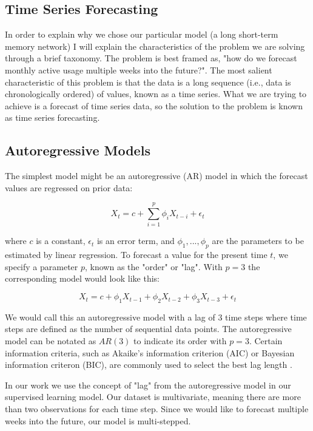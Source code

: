 \documentclass[11pt, oneside, authoryear]{report}
\begin{document}
\subsection{Time Series Forecasting}

In order to explain why we chose our particular model (a long short-term memory network) I will explain the characteristics of the problem we are solving through a brief taxonomy. The problem is best framed as, "how do we forecast monthly active usage multiple weeks into the future?". The most salient characteristic of this problem is that the data is a long sequence (i.e., data is chronologically ordered) of values, known as a time series. What we are trying to achieve is a forecast of time series data, so the solution to the problem is known as time series forecasting.

\subsection{Autoregressive Models}

The simplest model might be an autoregressive (AR) model in which the forecast values are regressed on prior data:

\begin{equation}
  \label{eq:1}
  X_t = c + \sum_{i=1}^p \phi_i X_{t-i} + \epsilon_t
\end{equation}

where $c$ is a constant, $\epsilon_t$ is an error term, and $\phi_1, ..., \phi_p$ are the parameters to be estimated by linear regression. To forecast a value for the present time $t$, we specify a parameter $p$, known as the "order" or "lag". With $p=3$ the corresponding model would look like this:

\begin{equation}
  \label{eq:2}
  X_t = c + \phi_1 X_{t-1} + \phi_2 X_{t-2} + \phi_3 X_{t-3} + \epsilon_t
\end{equation}

We would call this an autoregressive model with a lag of 3 time steps where time steps are defined as the number of sequential data points. The autoregressive model can be notated as $AR(3)$ to indicate its order with $p=3$. Certain information criteria, such as Akaike's information criterion (AIC) or Bayesian information criteron (BIC), are commonly used to select the best lag length \citep{liew}.

In our work we use the concept of "lag" from the autoregressive model in our supervised learning model. Our dataset is multivariate, meaning there are more than two observations for each time step. Since we would like to forecast multiple weeks into the future, our model is multi-stepped.
\end{document}

